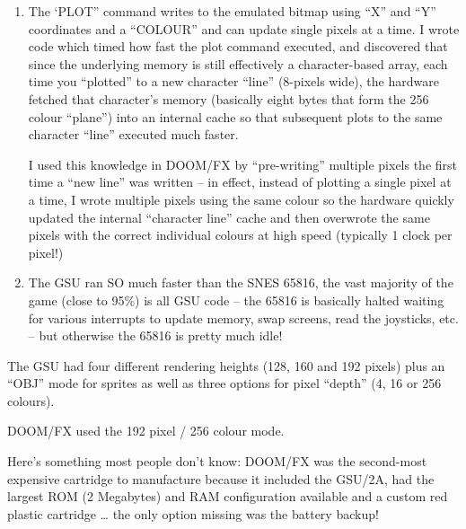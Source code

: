 {\begin{enumerate}
 

\item       The ‘PLOT” command writes to the emulated bitmap using “X” and “Y” coordinates and a “COLOUR” and can update single pixels at a time.  I wrote code which timed how fast the plot command executed, and discovered that since the underlying memory is still effectively a character-based array, each time you “plotted” to a new character “line” (8-pixels wide), the hardware fetched that character’s memory (basically eight bytes that form the 256 colour “plane”) into an internal cache so that subsequent plots to the same character “line” executed much faster.


I used this knowledge in DOOM/FX by “pre-writing” multiple pixels the first time a “new line” was written – in effect, instead of plotting a single pixel at a time, I wrote multiple pixels using the same colour so the hardware quickly updated the internal “character line” cache and then overwrote the same pixels with the correct individual colours at high speed (typically 1 clock per pixel!)

 

\item       The GSU ran SO much faster than the SNES 65816, the vast majority of the game (close to 95\%) is all GSU code – the 65816 is basically halted waiting for various interrupts to update memory, swap screens, read the joysticks, etc. – but otherwise the 65816 is pretty much idle!
\end{enumerate}
 

The GSU had four different rendering heights (128, 160 and 192 pixels) plus an “OBJ” mode for sprites as well as three options for pixel “depth” (4, 16 or 256 colours).\\
\par
 DOOM/FX used the 192 pixel / 256 colour mode.\\
\par
 Here’s something most people don’t know: DOOM/FX was the second-most expensive cartridge to manufacture because it included the GSU/2A, had the largest ROM (2 Megabytes) and RAM configuration available and a custom red plastic cartridge … the only option missing was the battery backup!}


